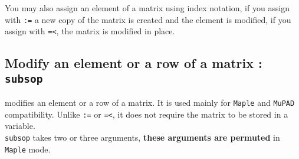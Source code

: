 \documentclass[a4paper,11pt]{book}
\begin{document}
You may also assign an element of a matrix using index notation,
if you assign with {\tt :=} a new copy of the matrix is created
and the element is modified, if you assign with {\tt =<},
the matrix is modified in place.

\subsection{Modify an element or a row of a matrix : {\tt subsop}}
 modifies an element or a row of a matrix.
It is used mainly for {\tt Maple} and {\tt MuPAD} compatibility.
Unlike {\tt :=} or {\tt =<},
it does not require the matrix to be stored in a variable.\\
{\tt subsop} takes two or three arguments,
{\bf these arguments are permuted} in {\tt Maple} mode.
\end{document}
